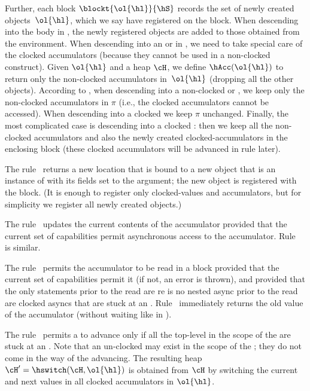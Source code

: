 Further,
each block $\blockt{\ol{\hl}}{\hS}$ records the set of newly created objects~$\ol{\hl}$, which we say have registered on the block.
When descending into the body in , the newly registered objects are added to
    those obtained from the environment.
When descending into an \async or \finish in , we need to take special care of the clocked
    accumulators (because they cannot be used in a non-clocked construct).
Given $\ol{\hl}$ and a heap $\cH$,
    we define
    $\hAcc(\ol{\hl})$ to return only the non-clocked accumulators in~$\ol{\hl}$
    (dropping all the other objects).
According to , when descending into a non-clocked
    \async or \finish, we keep only the non-clocked accumulators in $\pi$
    (i.e., the clocked accumulators cannot be accessed).
When descending into a clocked \async we keep $\pi$ unchanged.
Finally, the most complicated case is descending into a clocked \finish:
    then we keep all the non-clocked accumulators and also the newly created clocked-accumulators in the enclosing block
    (these clocked accumulators will be advanced in rule  later).

The rule~ returns a new location that is bound to a new
    object that is an instance of \hC{} with its fields set to the argument;
    the new object is registered with the block.
(It is enough to register only clocked-values and accumulators, but
    for simplicity we register all newly created objects.)




The rule~ updates the current contents of the
accumulator provided that the current set of capabilities permit
asynchronous access to the accumulator.
Rule~ is similar.

The rule~ permits the accumulator to be read in a
block provided that the current set of capabilities permit it (if not,
an error is thrown), and provided that the only statements prior to
the read are re is no nested async prior to the read are clocked
asyncs that are stuck at an \hadvance.
Rule~ immediately returns the old value of the accumulator (without waiting like in ).

The rule~ permits a  to advance
only if all the top-level  in the scope of the
 are stuck at an
.
Note that an un-clocked  may exist in the
scope of the ; they do not come in the way of the
     advancing.
The resulting heap~$\cH'=\hswitch(\cH,\ol{\hl})$ is obtained from $\cH$ by switching
    the current and next values in all clocked accumulators in $\ol{\hl}$.


